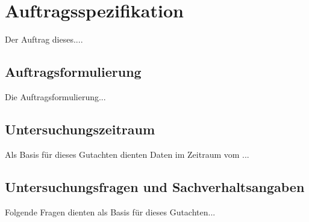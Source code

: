 \section*{Auftragsspezifikation}
\label{sec:auftragsspezifikation}
Der Auftrag dieses....

\subsection{Auftragsformulierung}
\label{sec:auftragsformulierung}
Die Auftragsformulierung...

\subsection{Untersuchungszeitraum}
\label{sec:untersuchungszeitraum}
Als Basis für dieses Gutachten dienten Daten im Zeitraum vom ...

\subsection{Untersuchungsfragen und Sachverhaltsangaben}
\label{sec:untersuchungsfragen}
Folgende Fragen dienten als Basis für dieses Gutachten...

